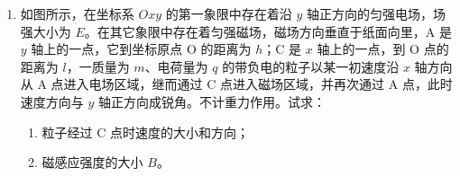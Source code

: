 \documentclass[\gkver]{gaokaozhenti}
\begin{document}
\begin{enumerate}
{$v_{H}'=\frac{2mv}{m+m_{H}}$　③

同理，对于质量为 $m_{N}$ 的氮核，其碰后速度为

$v_{N}'=\frac{2mv}{m+m_{N}}$　④

由③④式可得

$m=\frac{m_{N}v_{N}'-m_{H}v_{H}'}{v_{H}'-v_{N}'}$　⑤

根据题意可知

$v_{H}'=7.0v_{N}'$　⑥

将上式与题给数据代入⑤式得

$m=1.2\Uu$　⑦
}

\item
如图所示，在坐标系 $Oxy$ 的第一象限中存在着沿 $y$ 轴正方向的匀强电场，场强大小为 $E$。在其它象限中存在着匀强磁场，磁场方向垂直于纸面向里，A 是 $y$ 轴上的一点，它到坐标原点 O 的距离为 $h$；C 是 $x$ 轴上的一点，到 O 点的距离为 $l$，一质量为 $m$、电荷量为 $q$ 的带负电的粒子以某一初速度沿 $x$ 轴方向从 A 点进入电场区域，继而通过 C 点进入磁场区域，并再次通过 A 点，此时速度方向与 $y$ 轴正方向成锐角。不计重力作用。试求：

\begin{enumerate}
	\item
	粒子经过 C 点时速度的大小和方向；
	\item
	磁感应强度的大小 $B$。
\end{enumerate}



\end{enumerate}
\end{document}
